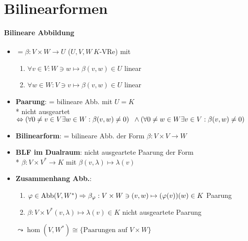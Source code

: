 \section{\label{sec:bilinearformen}Bilinearformen}

\paragraph{Bilineare Abbildung}
\begin{itemize}
	\item \( = \beta: V \times W \to U \) (\( U,V,W \ K \)-VRe) mit
	\begin{enumerate}
		\item \( \forall v \in V: W \ni w \mapsto \beta(v,w) \in U \) linear
		\item \( \forall w \in W: V \ni v \mapsto \beta(v,w) \in U \) linear
	\end{enumerate}

	\item \textbf{Paarung}: = bilineare Abb. mit \( U=K \)
		\\*
		nicht ausgeartet \( \Leftrightarrow (\forall 0 \neq v \in V \exists w \in W: \beta(v,w) \neq 0 ) \\* \phantom{x} \wedge (\forall 0 \neq w \in W \exists v \in V: \beta(v,w) \neq 0 ) \)

	\item \textbf{Bilinearform}: = bilineare Abb. der Form \( \beta: V \times V \to W \)

	\item \textbf{BLF im Dualraum}: nicht ausgeartete Paarung der Form \\* \( \beta: V \times V^\ast \to K \) mit \( \beta(v, \lambda) \mapsto \lambda(v) \)

	\item \textbf{Zusammenhang Abb.}:
		\begin{enumerate}
		 	\item \( \varphi \in \text{Abb}(V,W^\ast) \\* \Rightarrow \beta_\varphi: V \times W \ni (v,w) \mapsto (\varphi(v))(w) \in K \) Paarung
		 	\item \( \beta: V \times V^\ast (v, \lambda) \mapsto \lambda(v) \in K \) nicht ausgeartete Paarung
		 \end{enumerate} 
		 \( \leadsto \hom(V,W^\ast) \cong \{ \text{Paarungen auf } V \times W \} \)
\end{itemize}

